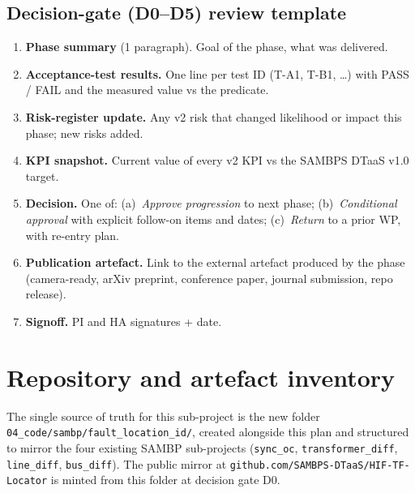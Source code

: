 \documentclass[11pt,a4paper]{article}
\begin{document}
\subsection{Decision-gate (D0--D5) review template}

\begin{enumerate}
  \item \textbf{Phase summary} (1 paragraph). Goal of the phase, what was
    delivered.
  \item \textbf{Acceptance-test results.} One line per test ID
    (T-A1, T-B1, \ldots) with PASS / FAIL and the measured value vs the
    predicate.
  \item \textbf{Risk-register update.} Any v2 risk that changed likelihood
    or impact this phase; new risks added.
  \item \textbf{KPI snapshot.} Current value of every v2 KPI vs the SAMBPS
    DTaaS v1.0 target.
  \item \textbf{Decision.} One of:
    (a)~\emph{Approve progression} to next phase;
    (b)~\emph{Conditional approval} with explicit follow-on items and dates;
    (c)~\emph{Return} to a prior WP, with re-entry plan.
  \item \textbf{Publication artefact.} Link to the external artefact
    produced by the phase (camera-ready, arXiv preprint, conference paper,
    journal submission, repo release).
  \item \textbf{Signoff.} PI and HA signatures + date.
\end{enumerate}

\section{Repository and artefact inventory}

The single source of truth for this sub-project is the new folder
\texttt{04\_code/sambp/fault\_location\_id/}, created alongside this plan
and structured to mirror the four existing SAMBP sub-projects
(\texttt{sync\_oc}, \texttt{transformer\_diff}, \texttt{line\_diff},
\texttt{bus\_diff}).  The public mirror at
\texttt{github.com/SAMBPS-DTaaS/HIF-TF-Locator} is minted from this folder
at decision gate D0.
\end{document}
